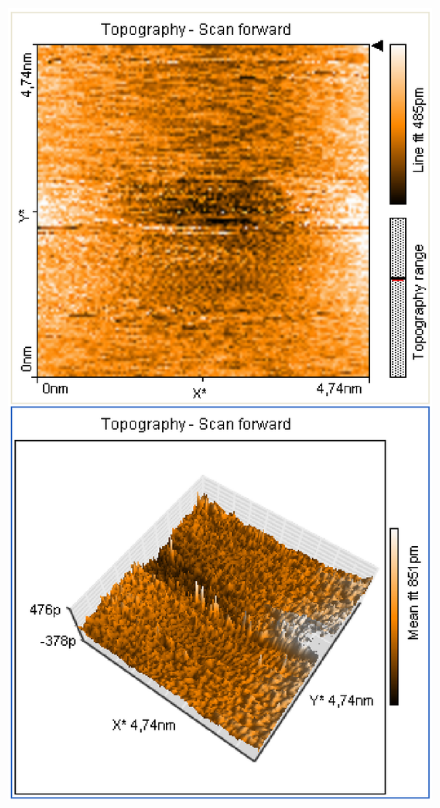 \documentclass[12pt]{article}
\begin{document}
\begin{figure}[H]
\begin{minipage}{0.4\linewidth}
\includegraphics[width=0.9\linewidth]{../plot/data/goldgitter/goldgitter6.eps}
\end{minipage}
\end{figure}
\end{document}
